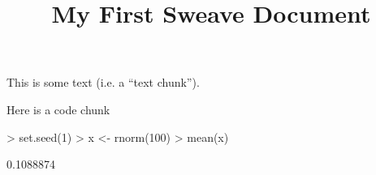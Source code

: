 \documentclass[11pt]{article}
\title{My First Sweave Document}
\begin{document}
\maketitle

This is some text (i.e. a ``text chunk'').

Here is a code chunk
\begin{Schunk}
\begin{Sinput}
> set.seed(1)
> x <- rnorm(100)
> mean(x)
\end{Sinput}
\begin{Soutput}
[1] 0.1088874
\end{Soutput}
\end{Schunk}
\end{document}
